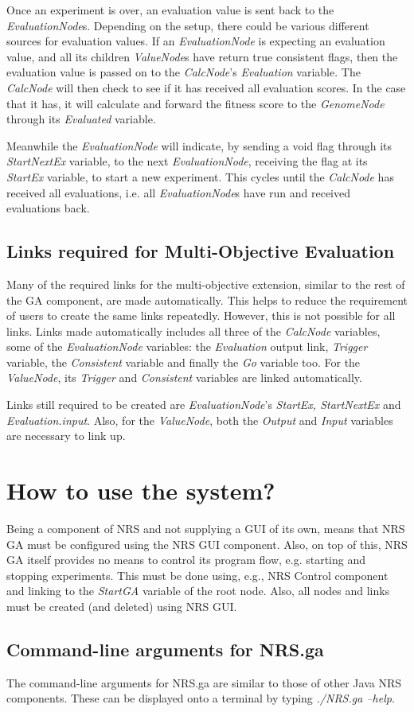 \documentclass[10pt, notitlepage, a4paper]{article}
\begin{document}
Once an experiment is over, an evaluation value is sent back to the {\it EvaluationNode}s. Depending on the setup, there could be various different sources for evaluation values. If an {\it EvaluationNode} is expecting an evaluation value, and all its children {\it ValueNode}s have return true consistent flags, then the evaluation value is passed on to the {\it CalcNode}'s {\it Evaluation} variable. The {\it CalcNode} will then check to see if it has received all evaluation scores. In the case that it has, it will calculate and forward the fitness score to the {\it GenomeNode} through its {\it Evaluated} variable.

Meanwhile the {\it EvaluationNode} will indicate, by sending a void flag through its {\it StartNextEx} variable, to the next {\it EvaluationNode}, receiving the flag at its {\it StartEx} variable, to start a new experiment. This cycles until the {\it CalcNode} has received all evaluations, i.e. all {\it EvaluationNode}s have run and received evaluations back.

\subsection{Links required for Multi-Objective Evaluation}
Many of the required links for the multi-objective extension, similar to the rest of the GA component, are made automatically. This helps to reduce the requirement of users to create the same links repeatedly. However, this is not possible for all links. Links made automatically includes all three of the {\it CalcNode} variables, some of the {\it EvaluationNode} variables: the {\it Evaluation} output link, {\it Trigger} variable, the {\it Consistent} variable and finally the {\it Go} variable too. For the {\it ValueNode}, its {\it Trigger} and {\it Consistent} variables are linked automatically.

Links still required to be created are {\it EvaluationNode}'s {\it StartEx, StartNextEx} and {\it Evaluation.input}. Also, for the {\it ValueNode}, both the {\it Output} and {\it Input} variables are necessary to link up.

\section{How to use the system?}
Being a component of NRS and not supplying a GUI of its own, means that NRS GA must be configured using the NRS GUI component. Also, on top of this, NRS GA itself provides no means to control its program flow, e.g. starting and stopping experiments. This must be done using, e.g., NRS Control component and linking to the {\it StartGA} variable of the root node. Also, all nodes and links must be created (and deleted) using NRS GUI.

\subsection{Command-line arguments for NRS.ga}
The command-line arguments for NRS.ga are similar to those of other Java
NRS components. These can be displayed onto a terminal by typing {\it
./NRS.ga --help}.
\end{document}
